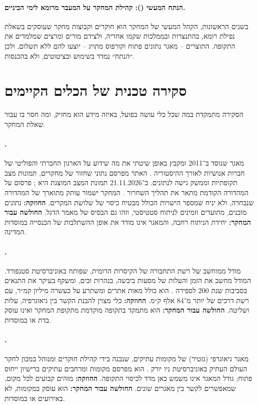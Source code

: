 \paragraph{הנתח המעשי (): קהילת המחקר על המעבר מרומא לימי הביניים.} בשנים הראשונות, הקהל המעשי של המחקר הוא חוקרים וקבוצות מחקר שעוסקים בשאלת נפילת רומא, בהתנצרות ובממלכות שקמו אחריה, ולצידם מורים ומרצים שמלמדים את התקופה. התוצרים – מאגר נתונים פתוח וקורפוס מתויג – יוצעו להם ללא תשלום, ולכן ״הנתח״ נמדד בשימוש ובציטוטים, ולא בהכנסות.

\section{סקירה טכנית של הכלים הקיימים}
\label{sec:market-tools}

הסקירה מתמקדת במה שכל כלי עושה בפועל, באיזה מידע הוא מחזיק, ומה חסר בו עבור שאלת המחקר.

\paragraph{.} מאגר שנוסד ב־2011 ומקבץ באופן שיטתי את מה שידוע על הארגון החברתי והפוליטי של חברות אנושיות לאורך ההיסטוריה \cite{seshat_web}. האתר מפרסם נתוני שחזור של מחקרים, תמונות מצב תקופתיות וממשק גישה לנתונים. ב־21.11.2026 תמונת המצב המוצגת היא  \cite{seshat_web}; פרסום על המהדורה הקודמת מתאר את תהליך השחרור \cite{francois2025polaris}. המחקר ישמור עותק מתוארך של המהדורה שנבחרה, ולא יניח שמספר הישויות הכולל מבטיח כיסוי של שלושת המקרים. \textbf{החוזקה:} נתונים מובנים, מתועדים וזמינים לניתוח סטטיסטי, וזהו גם הבסיס של מאמר הדגל. \textbf{החולשה עבור המחקר:} יחידת הניתוח רחבה, והמאגר אינו מודד את אופן ההשתלבות של הכנסייה במוסדות המדינה.

\paragraph{.} מודל ממוחשב של רשת התחבורה של הקיסרות הרומית, שפותח באוניברסיטת סטנפורד. המודל מחשב את הזמן והעלות של מסעות ביבשה, בנהרות ובים, ומשקף בעיקר את התנאים בסביבות שנת 200 לספירה \cite{scheidel2015orbis}. הוא כולל מאות אתרים ומשתרע על כעשרה מיליון קמ״ר, עם רשת דרכים של יותר מ־84 אלף ק״מ. \textbf{החוזקה:} כלי מצוין להבנת הקשר בין גיאוגרפיה, עלות ושליטה. \textbf{החולשה עבור המחקר:} הוא מתמקד בתקופה מוקדמת מתקופת המחקר ואינו עוסק בדת או במוסדות.

\paragraph{.} מאגר גיאוגרפי (גזטיר) של מקומות עתיקים, שנבנה בידי קהילת חוקרים ומנוהל במכון לחקר העולם העתיק באוניברסיטת ניו יורק \cite{pleiades_web}. הוא מפרסם מקומות ומרחבים עתיקים ברישיון ייחוס פתוח; גודל המאגר אינו משמש כאן מדד לכיסוי התקופה. \textbf{החוזקה:} מזהים קבועים לכל מקום, שמאפשרים לקשר בין מאגרים שונים. \textbf{החולשה עבור המחקר:} הוא עוסק במקומות, לא באירועים או במוסדות.

